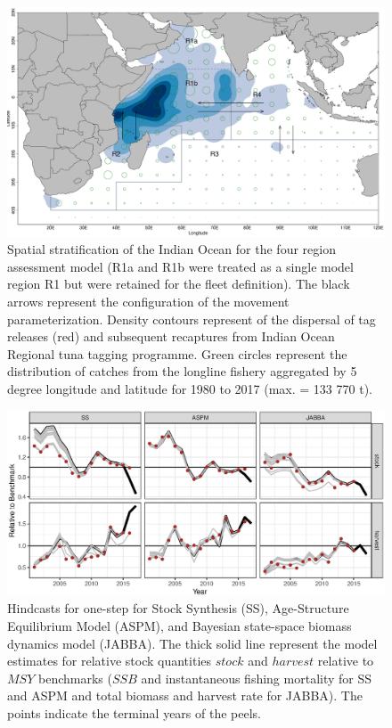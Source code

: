 \documentclass[12pt,halfline,a4paper,nonumbib]{ouparticle}
\begin{document}
\begin{figure}[!ht]
\centering
\includegraphics[width=6in]{fig1.eps}
\caption{Spatial stratification of the Indian Ocean for the four region assessment model (R1a and R1b were treated as a single model region R1 but were retained for the fleet definition). The black arrows represent the configuration of the movement parameterization.  Density contours represent of the dispersal of tag releases (red) and subsequent recaptures from Indian Ocean Regional tuna tagging programme. Green circles represent the distribution of catches from the longline fishery aggregated by 5 degree longitude and latitude for 1980 to 2017 (max. = 133 770 t).}
\label{fig:map}
\end{figure}


\begin{figure}
\centering
\includegraphics[width=6in]{fig2.eps}
\caption{Hindcasts for one-step for Stock Synthesis (SS),  Age-Structure Equilibrium Model (ASPM), and Bayesian state-space biomass dynamics model (JABBA).  The thick solid line represent the model estimates for relative stock quantities $stock$ and $harvest$ relative to $MSY$ benchmarks ($SSB$ and instantaneous fishing mortality for SS and ASPM and total biomass and harvest rate for JABBA). The points indicate the terminal years of the peels.}
\label{fig:retro}
\end{figure}
\end{document}
